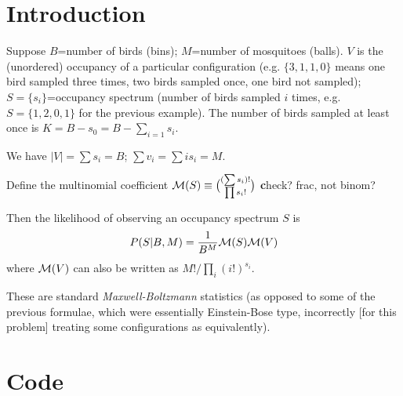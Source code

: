 \documentclass{article}\usepackage[]{graphicx}\usepackage[]{color}
\newcommand{\fixme}[1]{{\textbf #1}}
\newcommand{\multinom}{{\cal M}}
\newcommand{\fixme}[1]{\textbf{FIXME: #1}}
\begin{document}
\section{Introduction}
Suppose $B$=number of birds (bins); $M$=number of mosquitoes (balls).
$V$ is the (unordered) occupancy of a particular configuration
(e.g. $\{3,1,1,0\}$ means one bird sampled three times, two
birds sampled once, one bird not sampled);
$S=\{s_i\}$=occupancy spectrum (number of birds sampled $i$ times,
e.g. $S=\{1,2,0,1\}$ for the previous example).
The number of birds sampled at least once is 
$K=B-s_0=B-\sum_{i=1} s_i$.

We have $|V| = \sum s_i=B$;  $\sum v_i = \sum i s_i = M$.

Define the multinomial coefficient $\multinom(S) \equiv 
\binom{(\sum s_i)!}{\prod s_i!}$ \fixme{check? frac, not binom?}

Then the likelihood of observing an occupancy spectrum $S$ is
\begin{equation}
P(S|B,M) =  \frac{1}{B^M} \multinom(S) \multinom(V)
\end{equation}
where $\multinom(V)$ can also be written as
$M!/\prod_i (i!)^{s_i}$.

These are standard \emph{Maxwell-Boltzmann} statistics (as opposed
to some of the previous formulae, which were essentially Einstein-Bose
type, incorrectly [for this problem] treating some configurations
as equivalently).

\section{Code}
\end{document}

